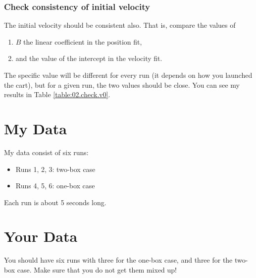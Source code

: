 \subsubsection{Check consistency of initial velocity}
%
The initial velocity should be consistent also. That is, compare the values of
\begin{enumerate}
    \item $B$ the linear coefficient in the position fit,
    \item and the value of the intercept in the velocity fit.
\end{enumerate}
The specific value will be different for every run (it depends on how you launched the cart), but for a given run, the two values should be close. You can see my results in Table \ref{table:02.check.v0}.
%
\section{My Data}
%
My data consist of six runs:
\begin{itemize}
    \item Runs 1, 2, 3: two-box case
    \item Runs 4, 5, 6: one-box case
\end{itemize}
Each run is about 5 seconds long.
%
\section{Your Data}
%
You should have six runs with three for the one-box case, and three for the two-box case. Make sure that you do not get them mixed up!
%
\newpage
